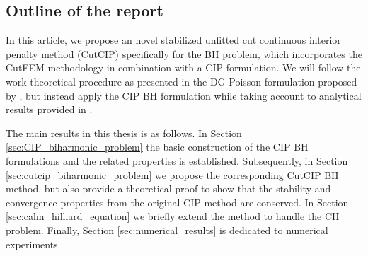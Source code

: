 \subsection{Outline of the report}%
\label{sub:outline_of_the_report}
In this article, we propose an novel stabilized unfitted cut continuous interior penalty method (CutCIP) specifically for the BH problem, which incorporates the CutFEM methodology in combination with a CIP formulation. We will follow the work theoretical
procedure as presented in the DG Poisson formulation proposed by \cite{gurkan2019stabilized}, but instead apply the CIP BH formulation while taking account to analytical results provided in \cite{feng2007fully, brenner2012quadratic}.

The main results in this thesis is as follows. In Section \ref{sec:CIP_biharmonic_problem} the basic construction of the CIP BH formulations and the related properties is established. Subsequently, in Section \ref{sec:cutcip_biharmonic_problem} we propose the corresponding CutCIP BH method, but also
provide a theoretical proof to show that the stability and convergence properties from the original CIP method are conserved. In Section \ref{sec:cahn_hilliard_equation} we briefly extend the method to handle the CH problem. Finally, Section
\ref{sec:numerical_results} is dedicated to numerical experiments.
